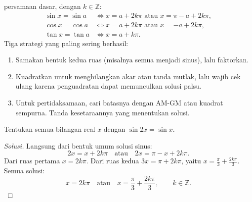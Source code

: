 \documentclass[12pt]{scrartcl}
\begin{document}
\begin{fact}
 persamaan dasar, dengan $k \in \mathbb{Z}$:
\begin{align*}
\sin x = \sin a &\iff x = a + 2k\pi \text{ atau } x = \pi - a + 2k\pi, \\
\cos x = \cos a &\iff x = a + 2k\pi \text{ atau } x = -a + 2k\pi, \\
\tan x = \tan a &\iff x = a + k\pi.
\end{align*}
Tiga strategi yang paling sering berhasil:
\begin{enumerate}
    \item Samakan bentuk kedua ruas (misalnya semua menjadi sinus), lalu faktorkan.
    \item Kuadratkan untuk menghilangkan akar atau tanda mutlak, lalu wajib cek ulang
    karena penguadratan dapat memunculkan solusi palsu.
    \item Untuk pertidaksamaan, cari batasnya dengan AM-GM atau kuadrat sempurna.
    Tanda kesetaraannya yang menentukan solusi.
\end{enumerate}
\end{fact}

\begin{example}
Tentukan semua bilangan real $x$ dengan $\sin 2x = \sin x$.
\end{example}
\begin{proof}[Solusi]
Langsung dari bentuk umum solusi sinus:
\[ 2x = x + 2k\pi \quad \text{atau} \quad 2x = \pi - x + 2k\pi. \]
Dari ruas pertama $x = 2k\pi$. Dari ruas kedua $3x = \pi + 2k\pi$, yaitu
$x = \frac{\pi}{3} + \frac{2k\pi}{3}$. Semua solusi:
\[ x = 2k\pi \quad \text{atau} \quad x = \frac{\pi}{3} + \frac{2k\pi}{3},
\qquad k \in \mathbb{Z}. \]
\end{proof}
\end{document}

